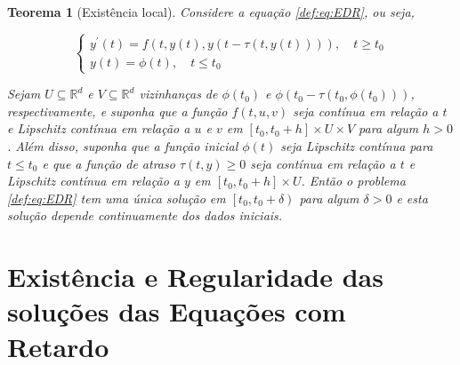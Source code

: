 \documentclass{beamer}
\theoremstyle{plain}
\newtheorem{teo}{Teorema}
\theoremstyle{definition}
\begin{document}

\begin{frame}
     
\begin{teo}[Existência local]
  \label{teo:local_existence:EDR}
  Considere a equação \eqref{def:eq:EDR}, ou seja,

  \[
    \left\{\begin{array}{l}
        y^{\prime}(t)=f(t, y(t), y(t-\tau(t, y(t)))), \quad t \geq t_{0}  \\
        y(t)=\phi(t), \quad t \leq t_{0}
    \end{array}\right.
  \]

  Sejam \(U \subseteq \mathbb{R}^{d}\) e \(V \subseteq \mathbb{R}^{d}\) vizinhanças de \(\phi\left(t_{0}\right)\) e \(\phi\left(t_{0}-\tau\left(t_{0}, \phi\left(t_{0}\right)\right)\right)\), respectivamente, e suponha que a função \(f(t, u, v)\) seja contínua em relação a \(t\) e Lipschitz contínua em relação a \(u\) e \(v\) em \(\left[t_{0}, t_{0}+h\right] \times U \times V\) para algum \(h>0\). Além disso, suponha que a função inicial \(\phi(t)\) seja Lipschitz contínua para \(t \leq t_{0}\) e que a função de atraso \(\tau(t, y) \geq 0\) seja contínua em relação a \(t\) e Lipschitz contínua em relação a \(y\) em \(\left[t_{0}, t_{0}+h\right] \times U\). Então o problema \ref{def:eq:EDR} tem uma única solução em \(\left[t_{0}, t_{0}+\delta\right)\) para algum \(\delta>0\) e esta solução depende continuamente dos dados iniciais.

\end{teo}
\end{frame}


\section{Existência e Regularidade das soluções das Equações com Retardo}
\end{document}
